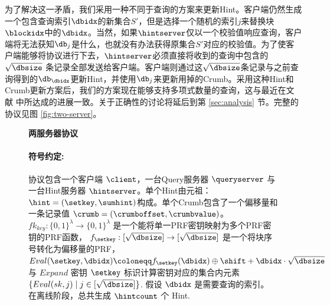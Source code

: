 为了解决这一矛盾，我们采用一种不同于查询的方案来更新Hint。客户端仍然生成一个包含查询索引$\dbidx$的新集合$S'$，但是选择一个随机的索引$j$来替换块$\blockidx$中的$\dbidx$。当然，如果$\hintserver$仅以一个校验值响应查询，客户端将无法获知$\db_{j}$是什么，也就没有办法获得原集合$S'$对应的校验值。为了使客户端能够将协议进行下去，$\hintserver$必须直接将收到的查询中包含的 $\sqrt{\dbsize}$ 条记录全部发送给客户端。客户端则通过这$\sqrt{\dbsize}$条记录与之前查询得到的$\db_\dbidx$更新Hint，并使用$\db_{j}$来更新用掉的Crumb。采用这种Hint和Crumb更新方案后，我们的方案现在能够支持多项式数量的查询，这与最近在文献 \cite{C:LazPap23} 中所达成的进展一致。关于正确性的讨论将延后到第 \ref{sec:analysis} 节。完整的协议见图 \ref{fig:two-server}。

\begin{figure}
    \begin{mdframed}
        \centering
        \textbf{两服务器协议}

        \raggedright
        \paragraph{符号约定:} 协议包含一个客户端 $\client$，一台Query服务器 $\queryserver$ 与一台Hint服务器 $\hintserver$。单个Hint由元祖：$\hint=(\setkey,\sumhint)$构成。单个Crumb包含了一个偏移量和一条记录值 $\crumb=(\crumboffset,\crumbvalue)$。$fk_{key}:\{0,1\}^\lambda \to \{0,1\}^\lambda$ 是一个能将单一PRF密钥映射为多个PRF密钥的PRF函数， $f_{\setkey}: [\sqrt{\dbsize}]\to [\sqrt{\dbsize}]$ 是一个将块序号转化为偏移量的PRF，  $Eval(\setkey,\dbidx) \coloneqq f_{\setkey}(\dbidx)\oplus \shift + \dbidx\cdot\sqrt{\dbsize}$ 与 $Expand$ 密钥 $\setkey$ 标识计算密钥对应的集合内元素 $\{Eval(sk,j) \mid j\in[\sqrt{\dbsize}]\}$. 假设 $\dbidx$ 是需要查询的索引。 在离线阶段，总共生成 $\hintcount$ 个 Hint.


\end{mdframed}
\end{figure}
